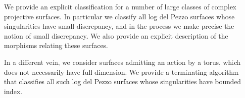 \documentclass[12pt,a4paper]{book}      %
\theoremstyle{definition}
\begin{document}
\begin{thesisabstract}               %
                        

We provide an explicit classification for a number of large classes of complex projective surfaces. In particular we classify all log del Pezzo surfaces whose singularities have small discrepancy, and in the process we make precise the notion of small discrepancy. We also provide an explicit description of the morphisms relating these surfaces.


 In a different vein, we consider surfaces admitting an action by a torus, which does not necessarily have full dimension. We provide a terminating algorithm that classifies all such log del Pezzo surfaces whose singularities have bounded index.

\end{thesisabstract}


\end{document}
